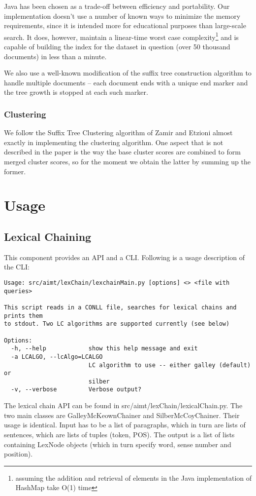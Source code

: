 \documentclass[11pt, a4paper, abstraction]{scrartcl}
\begin{document}
Java has been chosen as a trade-off between efficiency and portability. Our implementation doesn't use a number of known ways to minimize the memory requirements, since it is intended more for educational purposes than large-scale search. It does, however, maintain a linear-time worst case complexity\footnote{assuming the addition and retrieval of elements in the Java implementation of HashMap take O(1) time} and is capable of building the index for the dataset in question (over 50 thousand documents) in less than a minute.

We also use a well-known modification of the suffix tree construction algorithm to handle multiple documents -- each document ends with a unique end marker and the tree growth is stopped at each such marker.

\subsubsection{Clustering}
We follow the Suffix Tree Clustering algorithm of Zamir and Etzioni almost exactly in implementing the clustering algorithm. One aspect that is not described in the paper is the way the base cluster scores are combined to form merged cluster scores, so for the moment we obtain the latter by summing up the former.
 

\section{Usage}
\label{sec:usage}

\subsection{Lexical Chaining} 
This component provides an API and a CLI. Following is a usage description of the CLI: 

\begin{verbatim} 
Usage: src/aimt/lexChain/lexchainMain.py [options] <> <file with queries>

This script reads in a CONLL file, searches for lexical chains and prints them
to stdout. Two LC algorithms are supported currently (see below)

Options:
  -h, --help            show this help message and exit
  -a LCALGO, --lcAlgo=LCALGO
                        LC algorithm to use -- either galley (default) or
                        silber
  -v, --verbose         Verbose output?
\end{verbatim}
\noindent
The lexical chain API can be found in src/aimt/lexChain/lexicalChain.py. The two main classes are GalleyMcKeownChainer and SilberMcCoyChainer. Their usage is identical. Input has to be a list of paragraphs, which in turn are lists of sentences, which are lists of tuples (token, POS). The output is a list of lists containing LexNode objects (which in turn specify word, sense number and position).
\end{document}
